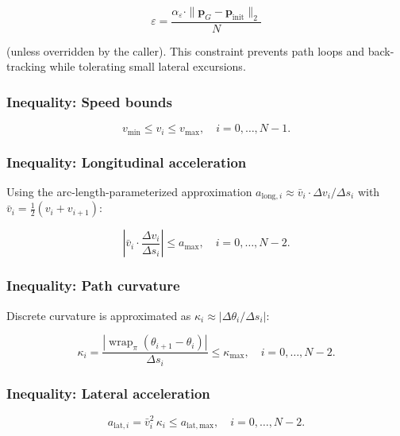 \documentclass[11pt,a4paper]{article}
\begin{document}
\begin{equation}
  \varepsilon = \frac{\alpha_\varepsilon \cdot
    \|\mathbf{p}_G - \mathbf{p}_{\mathrm{init}}\|_2}{N}
\end{equation}

(unless overridden by the caller).
This constraint prevents path loops and back-tracking while tolerating small
lateral excursions.

\subsubsection*{Inequality: Speed bounds}

\begin{equation}
  v_{\min} \le v_i \le v_{\max}, \quad i = 0, \ldots, N-1.
\end{equation}

\subsubsection*{Inequality: Longitudinal acceleration}

Using the arc-length-parameterized approximation
$a_{\mathrm{long},i} \approx \bar{v}_i \cdot \Delta v_i / \Delta s_i$
with $\bar{v}_i = \tfrac{1}{2}(v_i + v_{i+1})$:

\begin{equation}
  \left| \bar{v}_i \cdot \frac{\Delta v_i}{\Delta s_i} \right| \le a_{\max},
  \quad i = 0, \ldots, N-2.
\end{equation}

\subsubsection*{Inequality: Path curvature}

Discrete curvature is approximated as $\kappa_i \approx |\Delta\theta_i / \Delta s_i|$:

\begin{equation}
  \kappa_i = \frac{|\operatorname{wrap}_\pi(\theta_{i+1} - \theta_i)|}{\Delta s_i}
  \le \kappa_{\max},
  \quad i = 0, \ldots, N-2.
\end{equation}

\subsubsection*{Inequality: Lateral acceleration}

\begin{equation}
  a_{\mathrm{lat},i} = \bar{v}_i^2 \,\kappa_i \le a_{\mathrm{lat,max}},
  \quad i = 0, \ldots, N-2.
\end{equation}
\end{document}
